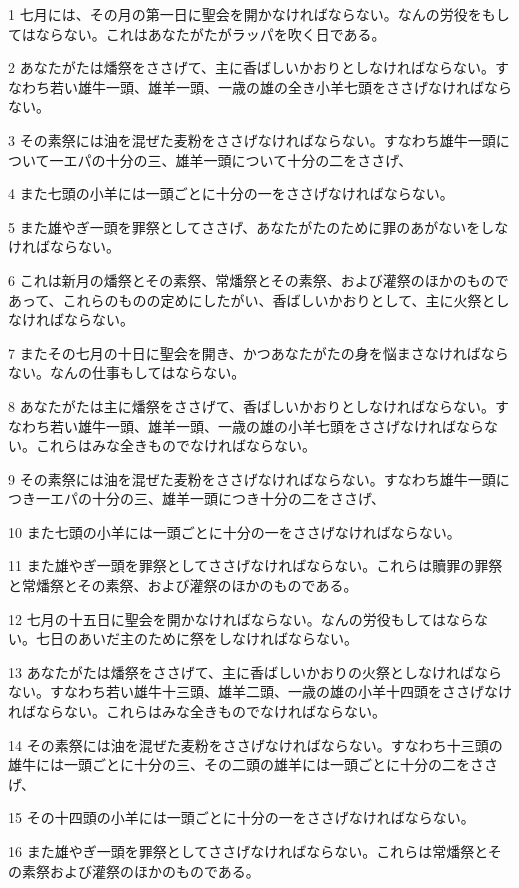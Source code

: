 \par 1 七月には、その月の第一日に聖会を開かなければならない。なんの労役をもしてはならない。これはあなたがたがラッパを吹く日である。
\par 2 あなたがたは燔祭をささげて、主に香ばしいかおりとしなければならない。すなわち若い雄牛一頭、雄羊一頭、一歳の雄の全き小羊七頭をささげなければならない。
\par 3 その素祭には油を混ぜた麦粉をささげなければならない。すなわち雄牛一頭について一エパの十分の三、雄羊一頭について十分の二をささげ、
\par 4 また七頭の小羊には一頭ごとに十分の一をささげなければならない。
\par 5 また雄やぎ一頭を罪祭としてささげ、あなたがたのために罪のあがないをしなければならない。
\par 6 これは新月の燔祭とその素祭、常燔祭とその素祭、および灌祭のほかのものであって、これらのものの定めにしたがい、香ばしいかおりとして、主に火祭としなければならない。
\par 7 またその七月の十日に聖会を開き、かつあなたがたの身を悩まさなければならない。なんの仕事もしてはならない。
\par 8 あなたがたは主に燔祭をささげて、香ばしいかおりとしなければならない。すなわち若い雄牛一頭、雄羊一頭、一歳の雄の小羊七頭をささげなければならない。これらはみな全きものでなければならない。
\par 9 その素祭には油を混ぜた麦粉をささげなければならない。すなわち雄牛一頭につき一エパの十分の三、雄羊一頭につき十分の二をささげ、
\par 10 また七頭の小羊には一頭ごとに十分の一をささげなければならない。
\par 11 また雄やぎ一頭を罪祭としてささげなければならない。これらは贖罪の罪祭と常燔祭とその素祭、および灌祭のほかのものである。
\par 12 七月の十五日に聖会を開かなければならない。なんの労役もしてはならない。七日のあいだ主のために祭をしなければならない。
\par 13 あなたがたは燔祭をささげて、主に香ばしいかおりの火祭としなければならない。すなわち若い雄牛十三頭、雄羊二頭、一歳の雄の小羊十四頭をささげなければならない。これらはみな全きものでなければならない。
\par 14 その素祭には油を混ぜた麦粉をささげなければならない。すなわち十三頭の雄牛には一頭ごとに十分の三、その二頭の雄羊には一頭ごとに十分の二をささげ、
\par 15 その十四頭の小羊には一頭ごとに十分の一をささげなければならない。
\par 16 また雄やぎ一頭を罪祭としてささげなければならない。これらは常燔祭とその素祭および灌祭のほかのものである。
